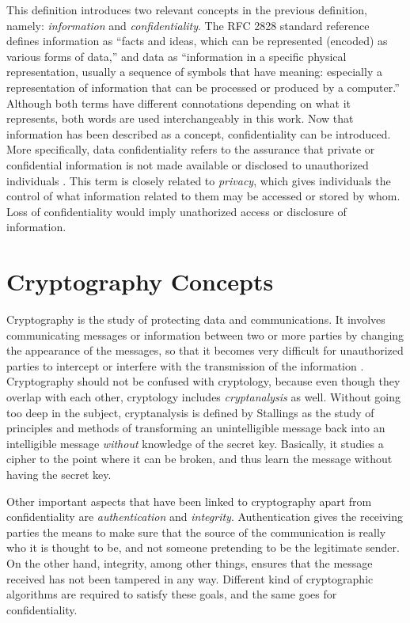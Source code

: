 This definition introduces two relevant concepts in the previous definition, namely: \emph{information} and \emph{confidentiality}. The RFC 2828 standard reference \cite{shirey2000rfc} defines information as ``facts and ideas, which can be represented (encoded) as various forms of data,'' and data as ``information in a specific physical representation, usually a sequence of symbols that have meaning: especially a representation of information that can be processed or produced by a computer.'' Although both terms have different connotations depending on what it represents, both words are used interchangeably in this work. Now that information has been described as a concept, confidentiality can be introduced. More specifically, data confidentiality refers to the assurance that private or confidential information is not made available or disclosed to unauthorized individuals \cite{CryptoStallings}. This term is closely related to \textit{privacy}, which gives individuals the control of what information related to them may be accessed or stored by whom. Loss of confidentiality would imply unathorized access or disclosure of information.

\section{Cryptography Concepts}

Cryptography is the study of protecting data and communications. It involves communicating messages or information between two or more parties by changing the appearance of the messages, so that it becomes very difficult for unauthorized parties to intercept or interfere with the transmission of the information \cite{IntroCryptoMath}. Cryptography should not be confused with cryptology, because even though they overlap with each other, cryptology includes \emph{cryptanalysis} as well. Without going too deep in the subject, cryptanalysis is defined by Stallings \cite{CryptoStallings}  as the study of principles and methods of transforming an unintelligible message back into an intelligible message \emph{without} knowledge of the secret key. Basically, it studies a cipher to the point where it can be broken, and thus learn the message without having the secret key.

Other important aspects that have been linked to cryptography apart from confidentiality are \textit{authentication} and \textit{integrity}. Authentication gives the receiving parties the means to make sure that the source of the communication is really who it is thought to be, and not someone pretending to be the legitimate sender. On the other hand, integrity, among other things, ensures that the message received has not been tampered in any way. Different kind of cryptographic algorithms are required to satisfy these goals, and the same goes for confidentiality.

